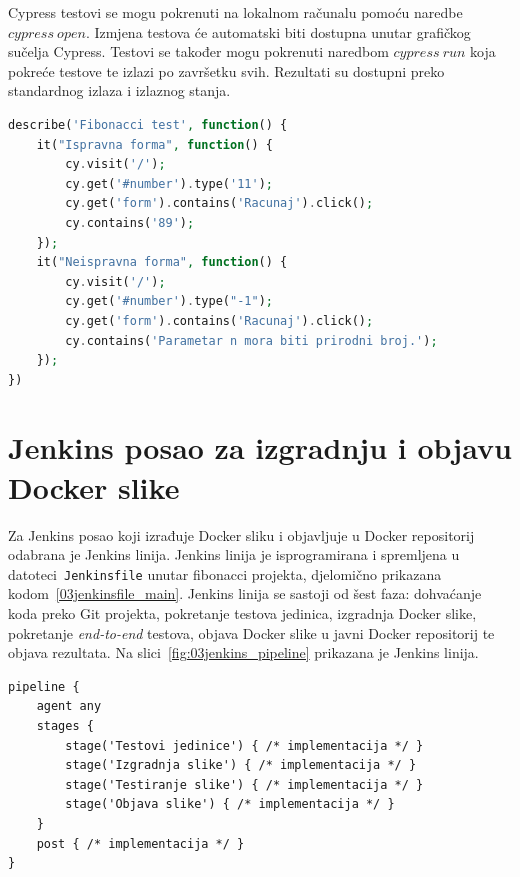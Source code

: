 Cypress testovi se mogu pokrenuti na lokalnom računalu pomoću naredbe $cypress~open$. Izmjena
testova će automatski biti dostupna unutar grafičkog sučelja Cypress. Testovi se također mogu
pokrenuti naredbom $cypress~run$ koja pokreće testove te izlazi po završetku svih. Rezultati su
dostupni preko standardnog izlaza i izlaznog stanja.

\begin{lstlisting}[language=php,float=h]
describe('Fibonacci test', function() {
    it("Ispravna forma", function() {
        cy.visit('/');
        cy.get('#number').type('11');
        cy.get('form').contains('Racunaj').click();
        cy.contains('89');
    });
    it("Neispravna forma", function() {
        cy.visit('/');
        cy.get('#number').type("-1");
        cy.get('form').contains('Racunaj').click();
        cy.contains('Parametar n mora biti prirodni broj.');
    });
})
\end{lstlisting}

\section{Jenkins posao za izgradnju i objavu Docker slike}
Za Jenkins posao koji izrađuje Docker sliku i objavljuje u Docker repositorij odabrana je Jenkins
linija. Jenkins linija je isprogramirana i spremljena u datoteci~\texttt{Jenkinsfile} unutar
fibonacci projekta, djelomično prikazana kodom~\ref{03jenkinsfile_main}. Jenkins linija se sastoji
od šest faza: dohvaćanje koda preko Git projekta, pokretanje testova jedinica, izgradnja Docker
slike, pokretanje \textit{end-to-end} testova, objava Docker slike u javni Docker repositorij te
objava rezultata. Na slici~\ref{fig:03jenkins_pipeline} prikazana je Jenkins linija.

\begin{lstlisting}[float=h]
pipeline {
    agent any
    stages {
        stage('Testovi jedinice') { /* implementacija */ }
        stage('Izgradnja slike') { /* implementacija */ }
        stage('Testiranje slike') { /* implementacija */ }
        stage('Objava slike') { /* implementacija */ }
    }
    post { /* implementacija */ }
}
\end{lstlisting}

